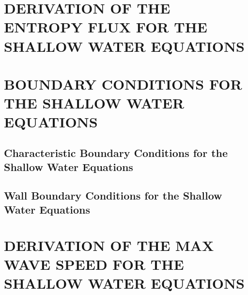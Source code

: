 \begin{appendices}
\renewcommand{\appendixname}{APPENDIX}

\chapter{DERIVATION OF THE ENTROPY FLUX FOR THE SHALLOW WATER EQUATIONS
\label{sec:shallow_water_entropy_flux}}
  
\chapter{BOUNDARY CONDITIONS FOR THE SHALLOW WATER EQUATIONS
\label{sec:boundary_conditions}}
  \section{Characteristic Boundary Conditions for the Shallow Water Equations}
    
  \section{Wall Boundary Conditions for the Shallow Water Equations}
    
\chapter{DERIVATION OF THE MAX WAVE SPEED FOR THE SHALLOW WATER EQUATIONS
\label{app:shallow_water_max_wave_speed}}
  

\end{appendices}
